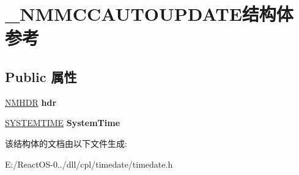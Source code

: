 \hypertarget{struct___n_m_m_c_c_a_u_t_o_u_p_d_a_t_e}{}\section{\+\_\+\+N\+M\+M\+C\+C\+A\+U\+T\+O\+U\+P\+D\+A\+T\+E结构体 参考}
\label{struct___n_m_m_c_c_a_u_t_o_u_p_d_a_t_e}
\subsection*{Public 属性}
\begin{DoxyCompactItemize}
\item 
\mbox{\label{struct___n_m_m_c_c_a_u_t_o_u_p_d_a_t_e_a3980710e4400af09a377666770c0e1c4}} 
\hyperlink{structtag_n_m_h_d_r}{N\+M\+H\+DR} {\bfseries hdr}
\item 
\mbox{\label{struct___n_m_m_c_c_a_u_t_o_u_p_d_a_t_e_a35275c5d52f586365490ec536bfc074c}} 
\hyperlink{struct___s_y_s_t_e_m_t_i_m_e}{S\+Y\+S\+T\+E\+M\+T\+I\+ME} {\bfseries System\+Time}
\end{DoxyCompactItemize}


该结构体的文档由以下文件生成\+:\begin{DoxyCompactItemize}
\item 
E\+:/\+React\+O\+S-\/0../dll/cpl/timedate/timedate.\+h\end{DoxyCompactItemize}
